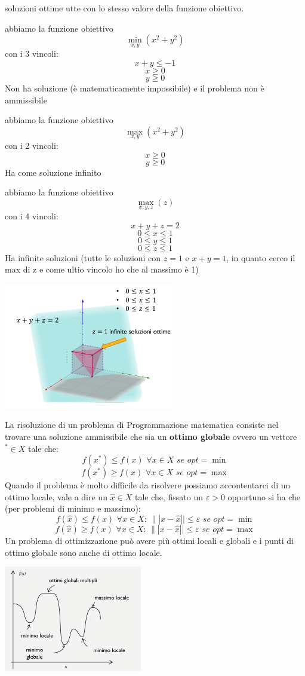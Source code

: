 \message{ !name(ro.tex)}\documentclass[a4paper,12pt, oneside]{book}
\begin{document}
soluzioni ottime utte con lo stesso valore della funzione
obiettivo.
\begin{esempio}
  abbiamo la funzione obiettivo
  \[\min_{x,y}(x^2+y^2)\]
  con i 3 vincoli:
  \[x+y \leq -1\]
  \[x\geq 0\]
  \[y\geq 0\]
  Non ha soluzione (è matematicamente impossibile) e il problema
  non è ammissibile
\end{esempio}
\begin{esempio}
  abbiamo la funzione obiettivo
  \[\max_{x,y}(x^2+y^2)\]
  con i 2 vincoli:
  \[x\geq 0\]
  \[y\geq 0\]
  Ha come soluzione infinito
\end{esempio}
\begin{esempio}
  abbiamo la funzione obiettivo
  \[\max_{x,y,z}(z)\]
  con i 4 vincoli:
  \[x+y+z = 2\]
  \[0\leq x \leq 1\]
  \[0\leq y \leq 1\]
  \[0\leq z \leq 1\]
  Ha infinite soluzioni (tutte le soluzioni con $z=1$ e $x+y=1$, in quanto cerco
  il max di z e come ultio vincolo ho che al massimo è 1)
  \begin{center}
    \includegraphics[scale = 1]{img/tri2.png}
  \end{center}
\end{esempio}
La risoluzione di un problema di Programmazione matematica consiste
nel trovare una soluzione ammissibile che sia un \textbf{ottimo
  globale} ovvero un vettore $^*\in X$ tale che:
\[f(x^*)\leq f(x)\,\,\forall x\in X\,\,se\,\,opt=\min\]
\[f(x^*)\geq f(x)\,\,\forall x\in X\,\,se\,\,opt=\max\]
Quando il problema è molto difficile da risolvere possiamo
accontentarci di un ottimo locale, vale a dire un $\hat{x}\in X$ tale
che, fissato un $\varepsilon > 0$ opportuno si ha che (per problemi di
minimo e massimo):
\[f(\hat{x})\leq f(x)\,\,\forall x\in X:\,\||x-\hat{x}||\leq
  \varepsilon\,\,se\,\,opt=\min\]
\[f(\hat{x})\geq f(x)\,\,\forall x\in X:\,\||x-\hat{x}||\leq \varepsilon\,\,se\,\,opt=\max\]
Un problema di ottimizzazione può avere più ottimi locali e globali e
i punti di ottimo globale sono anche di ottimo locale.
\begin{center}
  \includegraphics[scale = 1.3]{img/opt.png}
\end{center}
\end{document}
